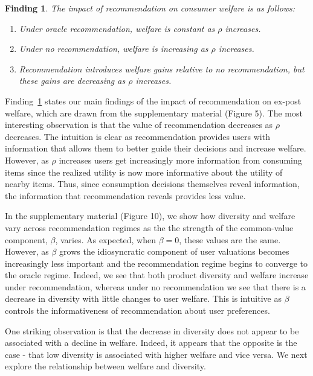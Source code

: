 \documentclass[format=acmsmall, review=false]{acmart}
\newtheorem{finding}{Finding}
\begin{document}
\begin{finding}\label{finding_welfare_gap}
The impact of recommendation on consumer welfare is as follows:
\begin{enumerate}
\item Under oracle recommendation, welfare is constant as $\rho$ increases.
\item Under no recommendation, welfare is increasing as $\rho$ increases.
\item Recommendation introduces welfare gains relative to no recommendation, but these gains are decreasing as $\rho$ increases. 
\end{enumerate}
\end{finding}
\par 
Finding~\ref{finding_welfare_gap} states our main findings of the impact of recommendation on ex-post welfare, which are drawn from the supplementary material (Figure 5). The most interesting observation is that the value of recommendation decreases as $\rho$ decreases. The intuition is clear as recommendation provides users with information that allows them to better guide their decisions and increase welfare. However, as $\rho$ increases users get increasingly more information from consuming items since the realized utility is now more informative about the utility of nearby items. Thus, since consumption decisions themselves reveal information, the information that recommendation reveals provides less value.
\par 
In the supplementary material (Figure 10), we show how diversity and welfare vary across recommendation regimes as the the strength of the common-value component, $\beta$, varies. As expected, when $\beta = 0$, these values are the same. However, as $\beta$ grows the idiosyncratic component of user valuations becomes increasingly less important and the recommendation regime begins to converge to the oracle regime. Indeed, we see that both product diversity and welfare increase under recommendation, whereas under no recommendation we see that there is a decrease in diversity with little changes to user welfare. This is intuitive as $\beta$ controls the informativeness of recommendation about user preferences.
\par 
One striking observation is that the decrease in diversity does not appear to be associated with a decline in welfare. Indeed, it appears that the opposite is the case - that low diversity is associated with higher welfare and vice versa. We next explore the relationship between welfare and diversity.
\end{document}
